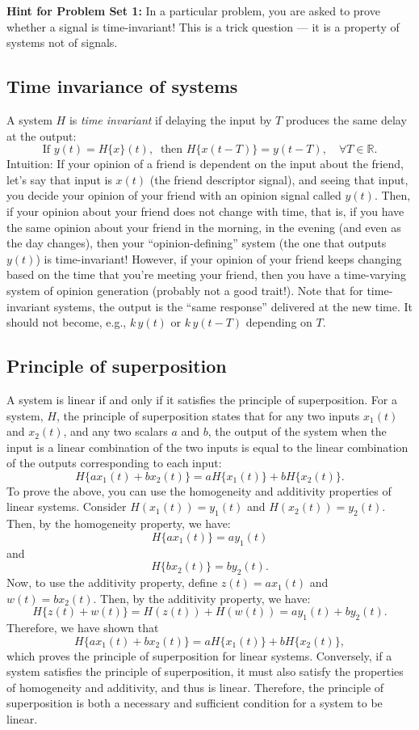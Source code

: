 \textbf{Hint for Problem Set 1:} In a particular problem, you are asked to prove whether a signal is time-invariant! This is a trick question --- it is a property of systems not of signals.  

\subsection{Time invariance of systems}
A system $H$ is \emph{time invariant} if delaying the input by $T$ produces the same delay at the output:
\[
\text{If }y(t)=H\{x\}(t),\ \text{ then }H\{x(t-T)\}=y(t-T),\quad\forall T\in\mathbb{R}.
\]
Intuition: If your opinion of a friend is dependent on the input about the friend, let's say that input is $x(t)$ (the friend descriptor signal), and seeing that input, you decide your opinion of your friend with an opinion signal called $y(t)$. Then, if your opinion about your friend does not change with time, that is, if you have the same opinion about your friend in the morning, in the evening (and even as the day changes), then your ``opinion-defining'' system (the one that outputs $y(t)$) is time-invariant! However, if your opinion of your friend keeps changing based on the time that you're meeting your friend, then you have a time-varying system of opinion generation (probably not a good trait!). Note that for time-invariant systems, the output is the ``same response'' delivered at the new time. It should not become, e.g., $k\,y(t)$ or $k\,y(t-T)$ depending on $T$.

\subsection{Principle of superposition}
A system is linear if and only if it satisfies the principle of superposition. For a system, $H$, the principle of superposition states that for any two inputs $x_1(t)$ and $x_2(t)$, and any two scalars $a$ and $b$, the output of the system when the input is a linear combination of the two inputs is equal to the linear combination of the outputs corresponding to each input:
\[
H\{a x_1(t) + b x_2(t)\} = a H\{x_1(t)\} + b H\{x_2(t)\}.
\]
To prove the above, you can use the homogeneity and additivity properties of linear systems. Consider $H(x_1(t)) = y_1(t)$ and $H(x_2(t)) = y_2(t)$. Then, by the homogeneity property, we have:
\[
H\{a x_1(t)\} =  a y_1(t)
\]
and
\[
H\{b x_2(t)\} =  b y_2(t).
\]
Now, to use the additivity property, define $z(t) = a x_1(t)$ and $w(t) = b x_2(t)$. Then, by the additivity property, we have:
\[
H\{z(t) + w(t)\} = H(z(t)) + H(w(t)) = a y_1(t) + b y_2(t).
\]
Therefore, we have shown that
\[
H\{a x_1(t) + b x_2(t)\} = a H\{x_1(t)\} + b H\{x_2(t)\},
\]
which proves the principle of superposition for linear systems. Conversely, if a system satisfies the principle of superposition, it must also satisfy the properties of homogeneity and additivity, and thus is linear. Therefore, the principle of superposition is both a necessary and sufficient condition for a system to be linear.




